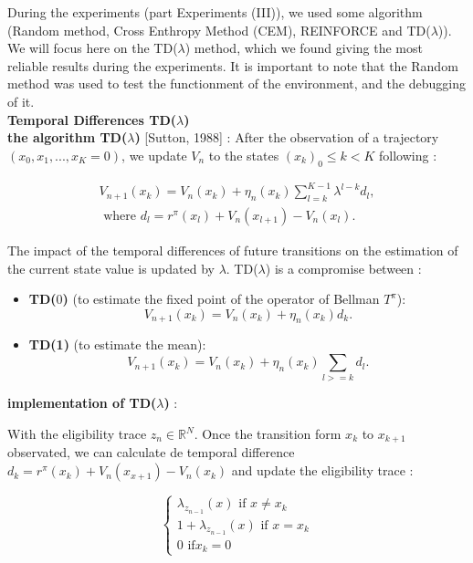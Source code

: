\documentclass[conference]{IEEEtran}
\begin{document}
During the experiments (part Experiments (III)), we used some algorithm (Random method, Cross Enthropy Method (CEM), REINFORCE and TD($\lambda$)). We will focus here on the TD($\lambda$) method, which we found giving the most reliable results during the experiments. It is important to note that the Random method was used to test the functionment of the environment, and the debugging of it.
\\
\textbf{Temporal Differences TD($\lambda$)}
\\
	

\textbf{the algorithm TD($\lambda$)} [Sutton, 1988] : After the observation of a trajectory $(x_0,x_1,...,x_K = 0)$, we update $V_n$	 to the states $(x_k)_0 \leqslant k<K$ following :


\begin{eqnarray*}
V_{n+1}(x_k) = V_n(x_k) + \eta_n(x_k)\sum_{l=k}^{K-1}\lambda^{l-k}d_l,\\ 
\mbox{ where } d_l = r^{\pi}(x_l) + V_n(x_{l+1})-V_n(x_l).
\end{eqnarray*}



The impact of the temporal differences of future transitions on the estimation of the current state value is updated by $\lambda$. TD($\lambda$) is a compromise between : 
\begin{itemize}
 \item \textbf{TD($0$)} (to estimate the fixed point of the operator of Bellman $T^{\pi}$): 
 \begin{equation*}
  V_{n+1}(x_k) = V_n(x_k) + \eta_n(x_k)d_k. 
 \end{equation*}
 \item \textbf{TD(1)} (to estimate the mean): 
 \begin{equation*} 
 V_{n+1}(x_k) = V_n(x_k) + \eta_n(x_k)\sum_{l>=k}d_l. 
 \end{equation*} 
\end{itemize}

\textbf{implementation of TD($\lambda$)} :

With the eligibility trace $z_n \in \mathbb{R}^N$. Once the transition form $x_k$ to $x_{k+1}$ observated, we can calculate de temporal difference $d_k = r^{\pi}(x_k)+V_n(x_{x+1})-V_n(x_k)$ and update the eligibility trace :


\begin{equation*}
 \left \{
   \begin{split}
    \lambda_{z_{n-1}}(x)  \text{ if } x \ne x_k \\
    1+\lambda_{z_{n-1}}(x) \text{ if } x = x_k \\
    0 \text{ if} x_k = 0
   \end{split}
 \right.
\end{equation*}
\end{document}
